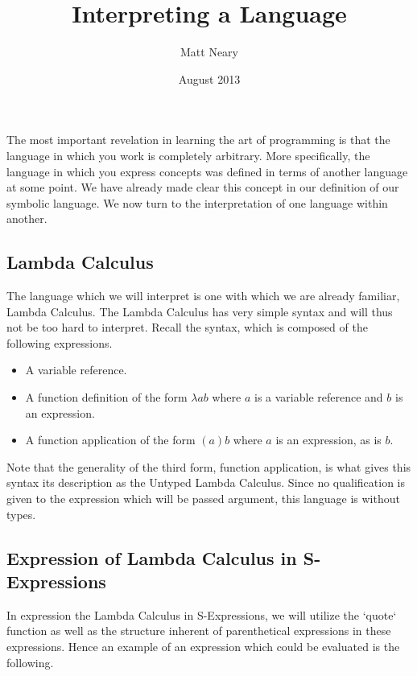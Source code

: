 \documentclass[11pt]{article}
\begin{document}
\begin{titlepage}
\title{Interpreting a Language}
\author{Matt Neary}
\date{August 2013}
\maketitle
\thispagestyle{empty}
\end{titlepage}
The most important revelation in learning the art of programming is that the language in which you work is completely arbitrary. More specifically, the language in which you express concepts was defined in terms of another language at some point. We have already made clear this concept in our definition of our symbolic language. We now turn to the interpretation of one language within another.

\subsection{Lambda Calculus}
The language which we will interpret is one with which we are already familiar, Lambda Calculus. The Lambda Calculus has very simple syntax and will thus not be too hard to interpret. Recall the syntax, which is composed of the following expressions.

\begin{itemize}
  \item A variable reference.
  \item A function definition of the form $\lambda a b$ where $a$ is a variable reference and $b$ is an expression.
  \item A function application of the form $(a)b$ where $a$ is an expression, as is $b$.
\end{itemize}

Note that the generality of the third form, function application, is what gives this syntax its description as the Untyped Lambda Calculus. Since no qualification is given to the expression which will be passed argument, this language is without types.

\subsection{Expression of Lambda Calculus in S-Expressions}
In expression the Lambda Calculus in S-Expressions, we will utilize the `quote` function as well as the structure inherent of parenthetical expressions in these expressions. Hence an example of an expression which could be evaluated is the following.
\end{document}
